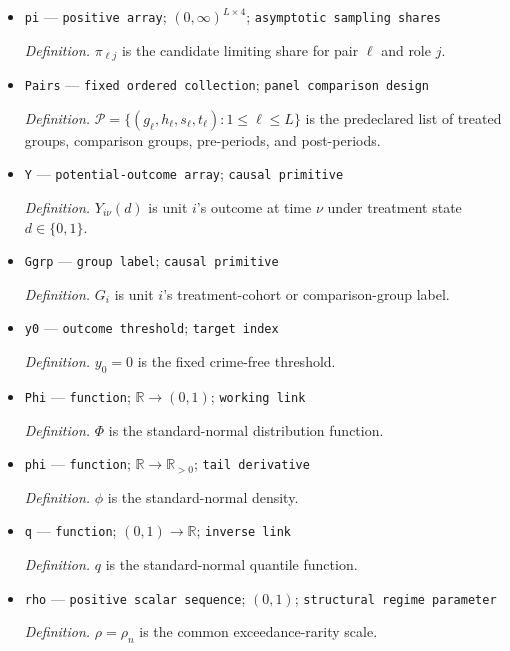 \documentclass{article}
\begin{document}
\begin{itemize}
  \item \texttt{pi} --- \texttt{positive array}; \((0,\infty)^{L\times4}\); \texttt{asymptotic sampling shares}
  \par\smallskip\noindent\emph{Definition.} \(\pi_{\ell j}\) is the candidate limiting share for pair \(\ell\) and role \(j\).
  \item \texttt{Pairs} --- \texttt{fixed ordered collection}; \texttt{panel comparison design}
  \par\smallskip\noindent\emph{Definition.} \(\mathcal P=\{(g_{\ell},h_{\ell},s_{\ell},t_{\ell}):1\le\ell\le L\}\) is the predeclared list of treated groups, comparison groups, pre-periods, and post-periods.
  \item \texttt{Y} --- \texttt{potential-\allowbreak{}outcome array}; \texttt{causal primitive}
  \par\smallskip\noindent\emph{Definition.} \(Y_{i\nu}(d)\) is unit \(i\)'s outcome at time \(\nu\) under treatment state \(d\in\{0,1\}\).
  \item \texttt{Ggrp} --- \texttt{group label}; \texttt{causal primitive}
  \par\smallskip\noindent\emph{Definition.} \(G_i\) is unit \(i\)'s treatment-cohort or comparison-group label.
  \item \texttt{y0} --- \texttt{outcome threshold}; \texttt{target index}
  \par\smallskip\noindent\emph{Definition.} \(y_0=0\) is the fixed crime-free threshold.
  \item \texttt{Phi} --- \texttt{function}; \(\mathbb R\to(0,1)\); \texttt{working link}
  \par\smallskip\noindent\emph{Definition.} \(\Phi\) is the standard-normal distribution function.
  \item \texttt{phi} --- \texttt{function}; \(\mathbb R\to\mathbb R_{>0}\); \texttt{tail derivative}
  \par\smallskip\noindent\emph{Definition.} \(\phi\) is the standard-normal density.
  \item \texttt{q} --- \texttt{function}; \((0,1)\to\mathbb R\); \texttt{inverse link}
  \par\smallskip\noindent\emph{Definition.} \(q\) is the standard-normal quantile function.
  \item \texttt{rho} --- \texttt{positive scalar sequence}; \((0,1)\); \texttt{structural regime parameter}
  \par\smallskip\noindent\emph{Definition.} \(\rho=\rho_n\) is the common exceedance-rarity scale.

\end{itemize}
\end{document}
